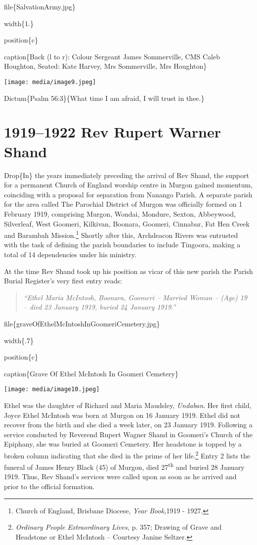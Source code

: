 file\{SalvationArmy.jpg\}

width\{1.\}

position\{c\}

caption\{Back (l to r): Colour Sergeant James Sommerville, CMS Caleb Houghton, Seated: Kate Harvey, Mrs Sommerville, Mrs Houghton\}

\texttt{[image: media/image9.jpeg]}

Dictum\{Psalm 56:3\}\{What time I am afraid, I will trust in thee.\}

\hypertarget{rev-rupert-warner-shand}{%
\chapter{1919--1922 Rev Rupert Warner Shand}\label{rev-rupert-warner-shand}}

Drop\{In\} the years immediately preceding the arrival of Rev Shand, the support for a permanent Church of England worship centre in Murgon gained momentum, coinciding with a proposal for separation from Nanango Parish. A separate parish for the area called The Parochial District of Murgon was officially formed on 1 February 1919, comprising Murgon, Wondai, Mondure, Sexton, Abbeywood, Silverleaf, West Goomeri, Kilkivan, Boonara, Goomeri, Cinnabar, Fat Hen Creek and Barambah Mission.\footnote{Church of England, Brisbane Diocese, \emph{Year Book,}1919 - 1927.} Shortly after this, Archdeacon Rivers was entrusted with the task of defining the parish boundaries to include Tingoora, making a total of 14 dependencies under his ministry.

At the time Rev Shand took up his position as vicar of this new parish the Parish Burial Register's very first entry reads:

\begin{quote}
\emph{``Ethel Maria McIntosh, Boonara, Goomeri -- Married Woman -- (Age) 19 -- died 23 January 1919, buried 24 January 1919.''}
\end{quote}

file\{graveOfEthelMcIntoshInGoomeriCemetery.jpg\}

width\{.7\}

position\{c\}

caption\{Grave Of Ethel McIntosh In Goomeri Cemetery\}

\texttt{[image: media/image10.jpeg]}

Ethel was the daughter of Richard and Maria Maudsley, \emph{Undaban}. Her first child, Joyce Ethel McIntosh was born at Murgon on 16 January 1919. Ethel did not recover from the birth and she died a week later, on 23 January 1919. Following a service conducted by Reverend Rupert Wagner Shand in Goomeri's Church of the Epiphany, she was buried at Goomeri Cemetery. Her headstone is topped by a broken column indicating that she died in the prime of her life.\footnote{\emph{Ordinary People Extraordinary Lives,} p. 357; Drawing of Grave and Headstone or Ethel McIntosh -- Courtesy Janine Seltzer.} Entry 2 lists the funeral of James Henry Black (45) of Murgon, died 27\textsuperscript{th} and buried 28 January 1919. Thus, Rev Shand's services were called upon as soon as he arrived and prior to the official formation.

